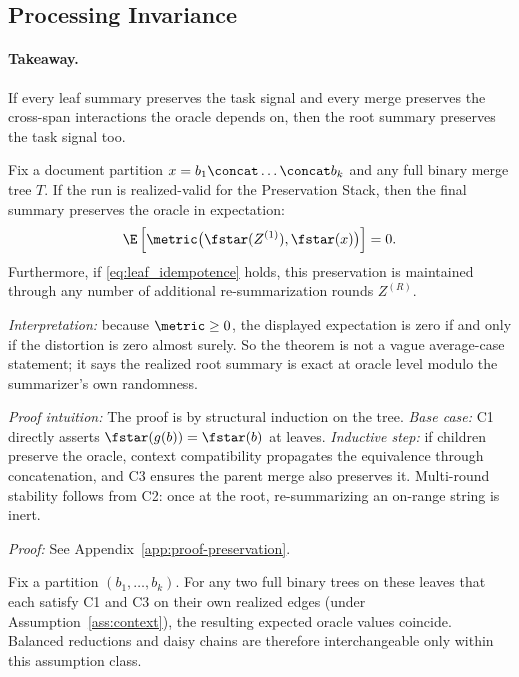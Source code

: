 \subsection{Processing Invariance}

\paragraph{Takeaway.}
If every leaf summary preserves the task signal and every merge preserves the cross-span interactions the oracle depends on, then the root summary preserves the task signal too.

\begin{theorem}\label{thm:one-pass}
Fix a document partition $x = b_1 \concat \dots \concat b_k$ and any full binary merge tree $T$. If the run is realized-valid for the Preservation Stack, then the final summary preserves the oracle in expectation:
\[
\E\left[\metric\big(\fstar(Z^{(1)}), \fstar(x)\big)\right] = 0.
\]
Furthermore, if \ref{eq:leaf_idempotence} holds, this preservation is maintained through any number of additional re-summarization rounds $Z^{(R)}$.
\end{theorem}

\noindent\textit{Interpretation:} because $\metric \ge 0$, the displayed expectation is zero if and only if the distortion is zero almost surely. So the theorem is not a vague average-case statement; it says the realized root summary is exact at oracle level modulo the summarizer's own randomness.

\noindent\textit{Proof intuition:} The proof is by structural induction on the tree. \emph{Base case:} C1 directly asserts $\fstar(g(b)) = \fstar(b)$ at leaves. \emph{Inductive step:} if children preserve the oracle, context compatibility propagates the equivalence through concatenation, and C3 ensures the parent merge also preserves it. Multi-round stability follows from C2: once at the root, re-summarizing an on-range string is inert.

\noindent\textit{Proof:} See Appendix~\ref{app:proof-preservation}.

\begin{corollary}\label{cor:schedule}
Fix a partition $(b_1, \ldots, b_k)$. For any two full binary trees on these leaves that each satisfy C1 and C3 on their own realized edges (under Assumption~\ref{ass:context}), the resulting expected oracle values coincide. Balanced reductions and daisy chains are therefore interchangeable only within this assumption class.
\end{corollary}

